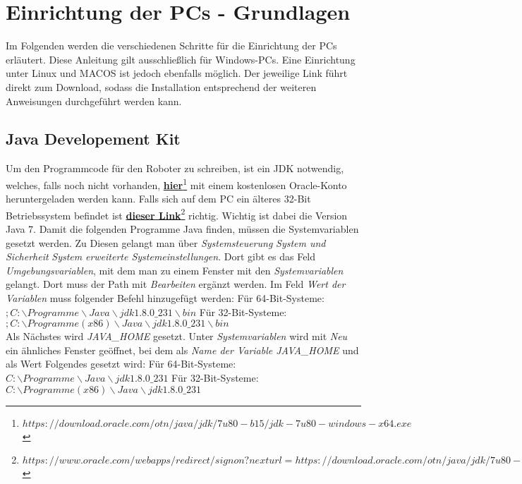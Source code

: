 \documentclass[
	ngerman,
	accentcolor=1c,%
	]{tudapub}
\begin{document}
\section{Einrichtung der PCs - Grundlagen}
\label{EinrichtungPC}
Im Folgenden werden die verschiedenen Schritte für die Einrichtung der PCs erl\"autert. Diese Anleitung gilt ausschlie\ss{}lich f\"ur Windows-PCs. Eine Einrichtung unter Linux und MACOS ist jedoch ebenfalls m\"oglich.\newline
Der jeweilige Link f\"uhrt direkt zum Download, sodass die Installation entsprechend der weiteren Anweisungen durchgef\"uhrt werden kann.\newline

\subsection{Java Developement Kit}
Um den Programmcode f\"ur den Roboter zu schreiben, ist ein JDK notwendig, welches, falls noch nicht vorhanden, 
\href{https://download.oracle.com/otn/java/jdk/7u80-b15/jdk-7u80-windows-x64.exe}{\textbf{hier}\footnote{$https://download.oracle.com/otn/java/jdk/7u80-b15/jdk-7u80-windows-x64.exe$}}
mit einem kostenlosen Oracle-Konto heruntergeladen werden kann. Falls sich auf dem PC ein \"alteres 32-Bit Betriebssystem befindet ist 
\href{https://www.oracle.com/webapps/redirect/signon?nexturl=https://download.oracle.com/otn/java/jdk/7u80-b15/jdk-7u80-windows-i586.exe}{\textbf{dieser Link}\footnote{$https://www.oracle.com/webapps/redirect/signon?nexturl=https://download.oracle.com/otn/java/jdk/7u80-b15/jdk-7u80-windows-i586.exe$}}
richtig. Wichtig ist dabei die Version Java 7.\newline
Damit die folgenden Programme Java finden, m\"ussen die Systemvariablen gesetzt werden. Zu Diesen gelangt man \"uber \textit{Systemsteuerung} \rightarrow{} \textit{System und Sicherheit} \rightarrow{} \textit{System} \rightarrow{} \textit{erweiterte Systemeinstellungen}. Dort gibt es das Feld \textit{Umgebungsvariablen}, mit dem man zu einem Fenster mit den \textit{Systemvariablen} gelangt. Dort muss der Path mit \textit{Bearbeiten} erg\"anzt werden. Im Feld \textit{Wert der Variablen} muss folgender Befehl hinzugef\"ugt werden:\newline
F\"ur 64-Bit-Systeme:\\$;C:\backslash Programme\backslash Java\backslash jdk1.8.0\_231\backslash bin$\newline
F\"ur 32-Bit-Systeme:\\$;C:\backslash Programme(x86)\backslash Java\backslash jdk1.8.0\_231\backslash bin$\\
Als N\"achstes wird \textit{JAVA\_HOME} gesetzt. Unter \textit{Systemvariablen} wird mit \textit{Neu} ein \"ahnliches Fenster ge\"offnet, bei dem als  \textit{Name der Variable JAVA\_HOME} und als Wert Folgendes gesetzt wird:\newline
F\"ur 64-Bit-Systeme:\\$C:\backslash Programme\backslash Java\backslash jdk1.8.0\_231$\newline
F\"ur 32-Bit-Systeme:\\$C:\backslash Programme(x86)\backslash Java\backslash jdk1.8.0\_231$\\
\end{document}
